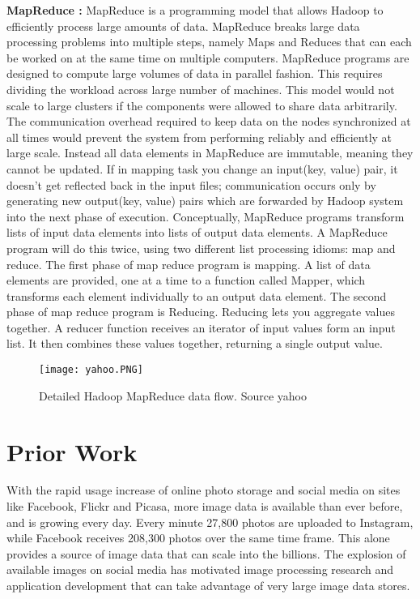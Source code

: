 \par \textbf{MapReduce :} MapReduce \cite{dean2008} is a programming model that allows Hadoop to efficiently process large amounts of data. MapReduce breaks large data processing problems into multiple steps, namely Maps and Reduces that can each be worked on at the same time on multiple computers. MapReduce programs are designed to compute large volumes of data in parallel fashion. This requires dividing the workload across large number of machines. This model would not scale to large clusters if the components were allowed to share data arbitrarily. The communication overhead required to keep data on the nodes synchronized at all times would prevent the system from performing reliably and efficiently at large scale. Instead all data elements in MapReduce are immutable, meaning they cannot be updated. If in mapping task you change an input(key, value) pair, it doesn’t get reflected back in the input files; communication occurs only by generating new output(key, value) pairs which are forwarded by Hadoop system into the next phase of execution. Conceptually, MapReduce programs transform lists of input data elements into lists of output data elements. A MapReduce program will do this twice, using two different list processing idioms: map and reduce. The first phase of map reduce program is mapping. A list of data elements are provided, one at a time to a function called Mapper, which transforms each element individually to an output data element. The second phase of map reduce program is Reducing. Reducing lets you aggregate values together. A reducer function receives an iterator of input values form an input list. It then combines these values together, returning a single output value.
\begin{figure}
\centering
    \texttt{[image: yahoo.PNG]}
    \caption{Detailed Hadoop MapReduce data flow. Source yahoo}
    \label{Fig: Detailed Hadoop MapReduce data flow. Source yahoo }
\end{figure}
\section{Prior Work}
With the rapid usage increase of online photo storage and social media
on sites like Facebook, Flickr and Picasa, more image data is
available than ever before, and is growing every day.  Every minute
27,800 photos are uploaded to Instagram,\cite{Horaczek2013} while
Facebook receives 208,300 photos over the same time frame. This alone
provides a source of image data that can scale into the billions.  The
explosion of available images on social media has motivated image
processing research and application development that can take
advantage of very large image data stores.

